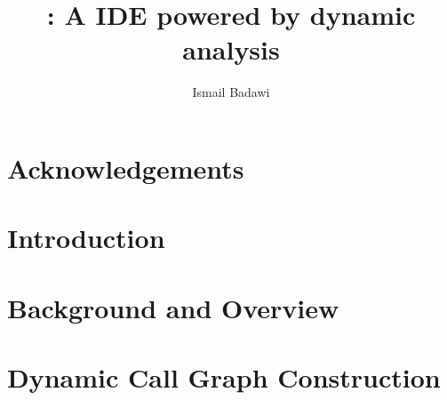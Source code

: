 \documentclass[MSc,twoside,openright]{Thesis}
\title{\mcide: A \matlab IDE powered by dynamic analysis}
\author{Ismail Badawi}
\begin{document}
\pagestyle{empty}

\maketitle
\cleardoublepage

\preface %

\begin{Abstract}

\end{Abstract}

\begin{Resume}

\end{Resume}

\chapter*{Acknowledgements}



\renewcommand{\contentsname}{Table of Contents}%
\addto\captionsenglish{%
  \renewcommand{\contentsname}%
    {Table of Contents}%
}
\addto\captionsenglish{%
  \renewcommand{\lstlistlistingname}%
    {List of Listings}%
}

\tableofcontents
\listoffigures
\listoftables
\renewcommand{\lstlistlistingname}{List of Listings}
\cleardoublepage

\maintext %

\pagestyle{fancyplain}

\chapter{Introduction} \label{chap:Introduction}


\chapter{Background and Overview} \label{chap:BackgroundAndOverview}


\chapter{Dynamic Call Graph Construction} \label{chap:DynamicCallGraphConstruction}

\end{document}
